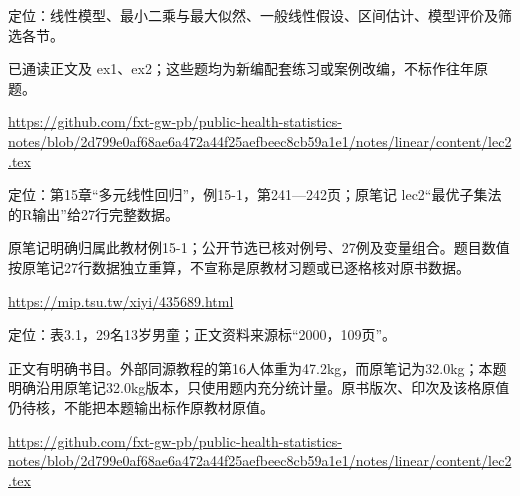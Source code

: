 \par\noindent\begin{minipage}{\linewidth}\label{src:NOTE-L2}
\par
定位：线性模型、最小二乘与最大似然、一般线性假设、区间估计、模型评价及筛选各节。\par
已通读正文及 ex1、ex2；这些题均为新编配套练习或案例改编，不标作往年原题。\par
{\small\url{https://github.com/fxt-gw-pb/public-health-statistics-notes/blob/2d799e0af68ae6a472a44f25aefbeec8cb59a1e1/notes/linear/content/lec2.tex}}\par
\end{minipage}\par\medskip

\par\noindent\begin{minipage}{\linewidth}\label{src:SUN15-1}
\par
定位：第15章“多元线性回归”，例15-1，第241—242页；原笔记 lec2“最优子集法的R输出”给27行完整数据。\par
原笔记明确归属此教材例15-1；公开节选已核对例号、27例及变量组合。题目数值按原笔记27行数据独立重算，不宣称是原教材习题或已逐格核对原书数据。\par
{\small\url{https://mip.tsu.tw/xiyi/435689.html}}\par
\end{minipage}\par\medskip

\par\noindent\begin{minipage}{\linewidth}\label{src:CHEN-LUNG29}
\par
定位：表3.1，29名13岁男童；正文资料来源标“2000，109页”。\par
正文有明确书目。外部同源教程的第16人体重为47.2kg，而原笔记为32.0kg；本题明确沿用原笔记32.0kg版本，只使用题内充分统计量。原书版次、印次及该格原值仍待核，不能把本题输出标作原教材原值。\par
{\small\url{https://github.com/fxt-gw-pb/public-health-statistics-notes/blob/2d799e0af68ae6a472a44f25aefbeec8cb59a1e1/notes/linear/content/lec2.tex}}\par
\end{minipage}\par\medskip

